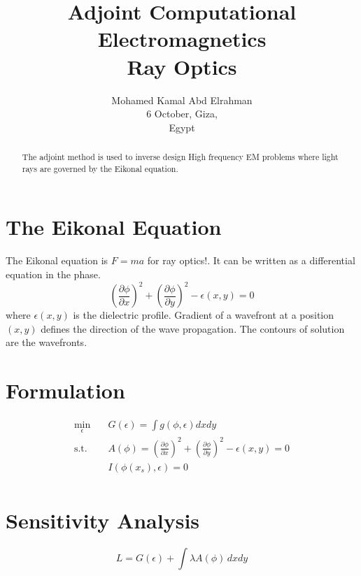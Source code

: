 \documentclass{tufte-handout}
\title{ Adjoint Computational Electromagnetics \\
	Ray Optics}
\author[mohamedkamal]{Mohamed Kamal Abd Elrahman \\
6 October, Giza,\\ Egypt}
\begin{document}
	\maketitle
	\begin{abstract}
		\noindent
		 The adjoint method is used to  inverse design High frequency EM problems where light rays are governed by the Eikonal equation.    
	\end{abstract}

\section{The Eikonal Equation}
The Eikonal equation is $ F = ma$ for ray optics!. It can be written as a differential equation in the phase.
\begin{equation}
\left( \frac{\partial \phi}{\partial x}\right) ^2 + \left( \frac{\partial \phi}{\partial y}\right) ^2 - \epsilon(x,y) = 0
\end{equation}
where $\epsilon(x,y)$ is the dielectric profile. Gradient of a wavefront at a position $(x,y)$ defines the direction of the wave propagation. The contours of solution are the wavefronts.
	\section{Formulation}
  \begin{equation}\label{opt_problem}
  \begin{aligned}
  \min_{\epsilon} \quad & G(\epsilon) = \int g(\phi,\epsilon) dx dy\\
  \textrm{s.t.} \quad & A(\phi) =  \left( \frac{\partial \phi}{\partial x}\right) ^2 + \left( \frac{\partial \phi}{\partial y}\right) ^2 - \epsilon(x,y) = 0\\
  &I(\phi(x_s),\epsilon) = 0   \\
  \end{aligned}
  \end{equation}
\section{Sensitivity Analysis}
\begin{equation}
L = G(\epsilon) + \int \lambda A(\phi) \, dx dy  
\end{equation}
\end{document}
